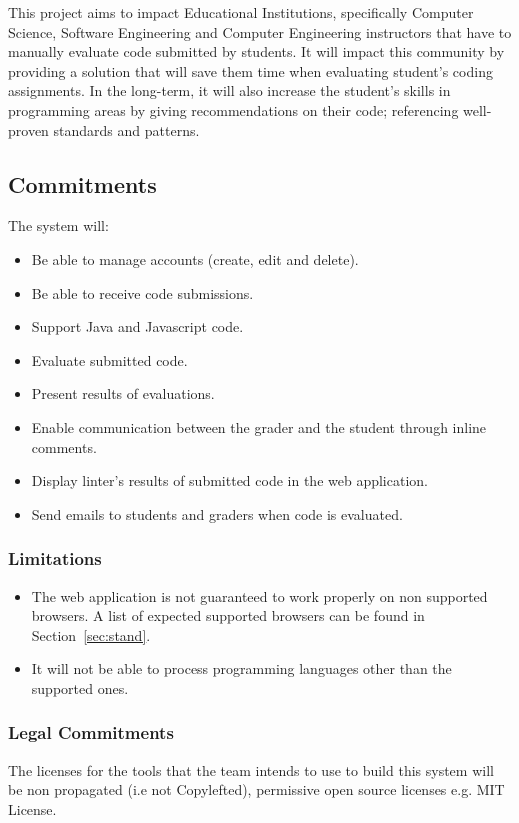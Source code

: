 
This project aims to impact Educational Institutions, specifically Computer
Science, Software Engineering and Computer Engineering instructors that have to
manually evaluate code submitted by students. It will impact this community by
providing a solution that will save them time when evaluating
student's coding assignments. In the long-term, it will also increase the
student's skills in programming areas by giving recommendations on their code;
referencing well-proven standards and patterns.

\subsection{Commitments}
The system will:
\begin{itemize}
\item Be able to manage accounts (create, edit and delete).
\item Be able to receive code submissions.
\item Support Java and Javascript code.
\item Evaluate submitted code.
\item Present results of evaluations.
\item Enable communication between the grader and the student through
inline comments.
\item Display linter's results of submitted code in the web application.
\item Send emails to students and graders when code is evaluated.
\end{itemize}

\subsubsection{Limitations}
\begin{itemize}
\item The web application is not guaranteed to work properly on non supported
browsers. A list of expected supported browsers can be found in Section~\ref{sec:stand}.
\item It will not be able to process programming languages other than the
supported ones.
\end{itemize}

\subsubsection{Legal Commitments}

The licenses for the tools that the team intends to use to build this system
will be non propagated (i.e not Copylefted), permissive open source licenses
e.g. MIT License.